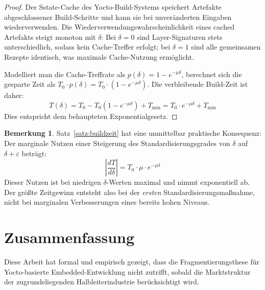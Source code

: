 ﻿\documentclass[a4paper,12pt]{article}
\theoremstyle{definition}
\newtheorem{bemerkung}{Bemerkung}
\begin{document}
\begin{proof}
	Der Sstate-Cache des Yocto-Build-Systems speichert Artefakte abgeschlossener
	Build-Schritte und kann sie bei unveränderten Eingaben wiederverwenden.
	Die Wiederverwendungswahrscheinlichkeit eines cached Artefakts steigt monoton
	mit $\delta$: Bei $\delta = 0$ sind Layer-Signaturen stets unterschiedlich,
	sodass kein Cache-Treffer erfolgt; bei $\delta = 1$ sind alle gemeinsamen
	Rezepte identisch, was maximale Cache-Nutzung ermöglicht.

	Modelliert man die Cache-Treffrate als $p(\delta) = 1 - e^{-\mu \delta}$,
	berechnet sich die gesparte Zeit als $T_0 \cdot p(\delta) = T_0 \cdot (1 - e^{-\mu \delta})$.
	Die verbleibende Build-Zeit ist daher:
	\[
	T(\delta) = T_0 - T_0(1 - e^{-\mu \delta}) + T_{\min} = T_0 \cdot e^{-\mu \delta} + T_{\min}
	\]
	Dies entspricht dem behaupteten Exponentialgesetz.
\end{proof}

\begin{bemerkung}
	Satz~\ref{satz:buildzeit} hat eine unmittelbar praktische Konsequenz:
	Der marginale Nutzen einer Steigerung des Standardisierungsgrades von $\delta$ auf
	$\delta + \varepsilon$ beträgt:
	\[
	\left|\frac{dT}{d\delta}\right| = T_0 \cdot \mu \cdot e^{-\mu \delta}
	\]
	Dieser Nutzen ist bei niedrigen $\delta$-Werten maximal und nimmt exponentiell ab.
	Der größte Zeitgewinn entsteht also bei der \emph{ersten} Standardisierungsmaßnahme,
	nicht bei marginalen Verbesserungen eines bereits hohen Niveaus.
\end{bemerkung}

\section{Zusammenfassung}

Diese Arbeit hat formal und empirisch gezeigt, dass die Fragmentierungsthese für
Yocto-basierte Embedded-Entwicklung nicht zutrifft, sobald die Marktstruktur der
zugrundeliegenden Halbleiterindustrie berücksichtigt wird.
\end{document}
